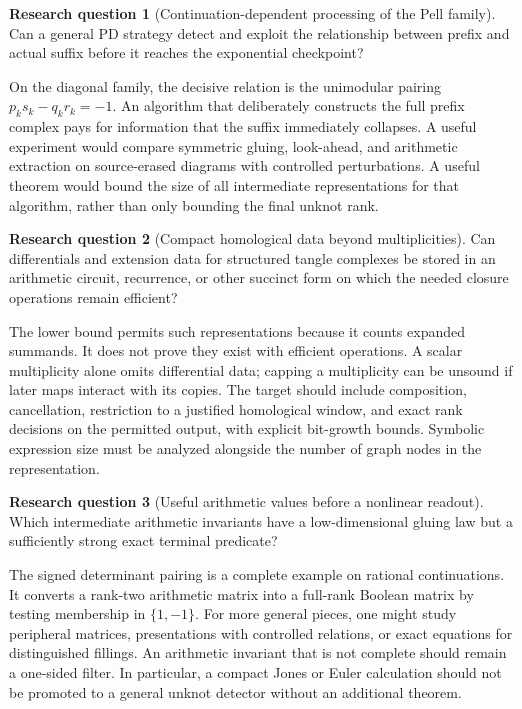 \documentclass[11pt,a4paper]{article}
\theoremstyle{definition}
\newtheorem{researchquestion}{Research question}
\theoremstyle{remark}
\numberwithin{equation}{section}
\begin{document}
\begin{researchquestion}[Continuation-dependent processing of the Pell family]
Can a general PD strategy detect and exploit the relationship between
prefix and actual suffix before it reaches the exponential checkpoint?
\end{researchquestion}
On the diagonal family, the decisive relation is the unimodular pairing
\(p_ks_k-q_kr_k=-1\). An algorithm that deliberately constructs the
full prefix complex pays for information that the suffix immediately
collapses. A useful experiment would compare symmetric gluing,
look-ahead, and arithmetic extraction on source-erased diagrams with
controlled perturbations. A useful theorem would bound the size of all
intermediate representations for that algorithm, rather than only
bounding the final unknot rank.

\begin{researchquestion}[Compact homological data beyond multiplicities]
Can differentials and extension data for structured tangle complexes be
stored in an arithmetic circuit, recurrence, or other succinct form on
which the needed closure operations remain efficient?
\end{researchquestion}
The lower bound permits such representations because it counts expanded
summands. It does not prove they exist with efficient operations.
A scalar multiplicity alone omits differential data; capping a multiplicity
can be unsound if later maps interact with its copies. The target should
include composition, cancellation, restriction to a justified homological
window, and exact rank decisions on the permitted output, with explicit
bit-growth bounds. Symbolic expression size must be analyzed alongside
the number of graph nodes in the representation.

\begin{researchquestion}[Useful arithmetic values before a nonlinear readout]
Which intermediate arithmetic invariants have a low-dimensional gluing
law but a sufficiently strong exact terminal predicate?
\end{researchquestion}
The signed determinant pairing is a complete example on rational
continuations. It converts a rank-two arithmetic matrix into a full-rank
Boolean matrix by testing membership in \(\{1,-1\}\).
For more general pieces, one might study peripheral matrices, presentations
with controlled relations, or exact equations for distinguished fillings.
An arithmetic invariant that is not complete should remain a one-sided
filter. In particular, a compact Jones or Euler calculation should not be
promoted to a general unknot detector without an additional theorem.
\end{document}
